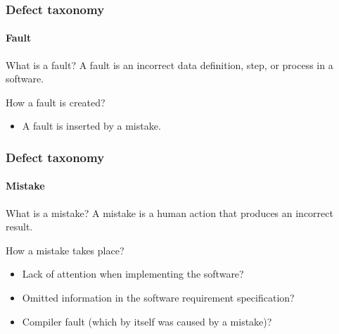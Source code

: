 \begin{frame}[parent={cmap:software-testing-foundations}, hasprev=false, hasnext=true]
\frametitle{Defect taxonomy}
\framesubtitle{Fault}
\label{concept:fault}

\begin{block:concept}{What is a fault?}
A fault is an incorrect data definition, step, or process in a software.
\end{block:concept}

\begin{block:fact}{How a fault is created?}
\begin{itemize}
	\item A fault is inserted by a mistake.
\end{itemize}
\end{block:fact}

\hfill
{}
\end{frame}



\begin{frame}[hasprev=true, hasnext=true]
\label{concept:mistake}
\frametitle{Defect taxonomy}
\framesubtitle{Mistake}

\begin{block:concept}{What is a mistake?}
A mistake is a human action that produces an incorrect result.
\end{block:concept}

\begin{block:fact}{How a mistake takes place?}
\begin{itemize}
	\item Lack of attention when implementing the software?

	\item Omitted information in the software requirement specification?

	\item Compiler fault (which by itself was caused by a mistake)?
\end{itemize}
\end{block:fact}

\hfill
{}
\end{frame}



